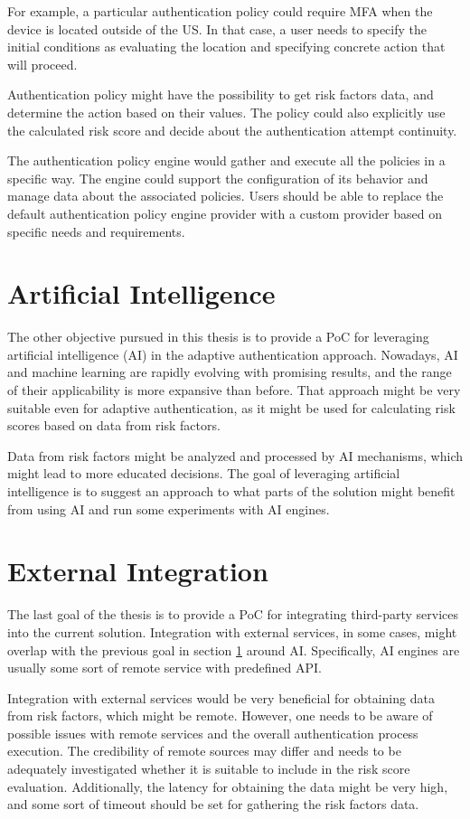 For example, a particular authentication policy could require MFA when the device is located outside of the US.
In that case, a user needs to specify the initial conditions as evaluating the location and specifying concrete action that will proceed.

Authentication policy might have the possibility to get risk factors data, and determine the action based on their values.
The policy could also explicitly use the calculated risk score and decide about the authentication attempt continuity.

The authentication policy engine would gather and execute all the policies in a specific way.
The engine could support the configuration of its behavior and manage data about the associated policies.
Users should be able to replace the default authentication policy engine provider with a custom provider based on specific needs and requirements.

\section{Artificial Intelligence}\label{spec-ai}
The other objective pursued in this thesis is to provide a PoC for leveraging artificial intelligence (AI) in the adaptive authentication approach.
Nowadays, AI and machine learning are rapidly evolving with promising results, and the range of their applicability is more expansive than before.
That approach might be very suitable even for adaptive authentication, as it might be used for calculating risk scores based on data from risk factors.

Data from risk factors might be analyzed and processed by AI mechanisms, which might lead to more educated decisions.
The goal of leveraging artificial intelligence is to suggest an approach to what parts of the solution might benefit from using AI and run some experiments with AI engines.

\section{External Integration} \label{spec-external-integration}
The last goal of the thesis is to provide a PoC for integrating third-party services into the current solution.
Integration with external services, in some cases, might overlap with the previous goal in section \ref{spec-ai} around AI.
Specifically, AI engines are usually some sort of remote service with predefined API. 

Integration with external services would be very beneficial for obtaining data from risk factors, which might be remote.
However, one needs to be aware of possible issues with remote services and the overall authentication process execution.
The credibility of remote sources may differ and needs to be adequately investigated whether it is suitable to include in the risk score evaluation.
Additionally, the latency for obtaining the data might be very high, and some sort of timeout should be set for gathering the risk factors data.

